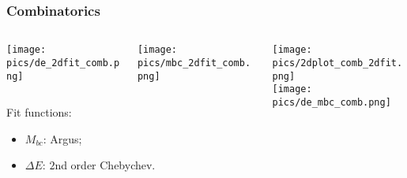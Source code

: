 \documentclass[10 pt,compress,mathserif]{beamer}
\begin{document}
\begin{frame}
 \frametitle{Combinatorics}
 \begin{columns}
  \begin{column}{0.7\textwidth}
  \begin{columns}
   \begin{column}{0.5\textwidth}
    \texttt{[image: pics/de\_2dfit\_comb.png]}
   \end{column}
   \begin{column}{0.5\textwidth}
    \texttt{[image: pics/mbc\_2dfit\_comb.png]}
   \end{column}
  \end{columns}
  Fit functions:
 \begin{itemize}
  \item $M_{bc}$: Argus;
  \item $\Delta E$: $2$nd order Chebychev.
 \end{itemize}
 \end{column}
 \begin{column}{0.3\textwidth}
  \texttt{[image: pics/2dplot\_comb\_2dfit.png]}\\
  \texttt{[image: pics/de\_mbc\_comb.png]}
 \end{column}
\end{columns}
\end{frame}
\end{document}
